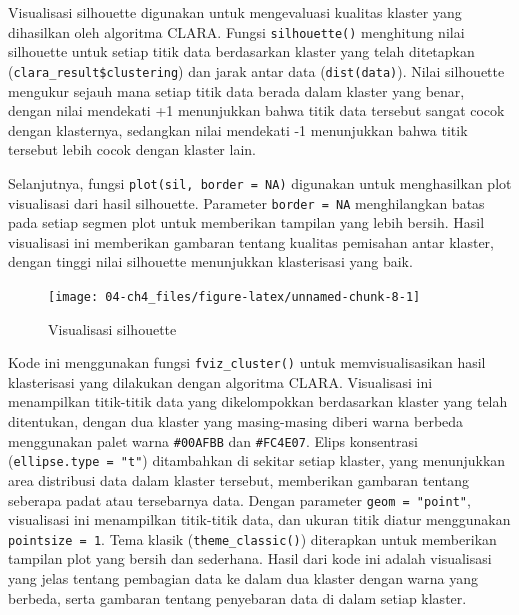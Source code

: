 \documentclass[
  oneside]{book}
\newenvironment{Shaded}{\begin{snugshade}}{\end{snugshade}}
\newcommand{\AttributeTok}[1]{\textcolor[rgb]{0.13,0.29,0.53}{#1}}
\newcommand{\ConstantTok}[1]{\textcolor[rgb]{0.56,0.35,0.01}{#1}}
\newcommand{\FunctionTok}[1]{\textcolor[rgb]{0.13,0.29,0.53}{\textbf{#1}}}
\newcommand{\NormalTok}[1]{#1}
\newcommand{\OtherTok}[1]{\textcolor[rgb]{0.56,0.35,0.01}{#1}}
\newcommand{\SpecialCharTok}[1]{\textcolor[rgb]{0.81,0.36,0.00}{\textbf{#1}}}
\begin{document}
Visualisasi silhouette digunakan untuk mengevaluasi kualitas klaster yang dihasilkan oleh algoritma CLARA. Fungsi \texttt{silhouette()} menghitung nilai silhouette untuk setiap titik data berdasarkan klaster yang telah ditetapkan (\texttt{clara\_result\$clustering}) dan jarak antar data (\texttt{dist(data)}). Nilai silhouette mengukur sejauh mana setiap titik data berada dalam klaster yang benar, dengan nilai mendekati +1 menunjukkan bahwa titik data tersebut sangat cocok dengan klasternya, sedangkan nilai mendekati -1 menunjukkan bahwa titik tersebut lebih cocok dengan klaster lain.

Selanjutnya, fungsi \texttt{plot(sil,\ border\ =\ NA)} digunakan untuk menghasilkan plot visualisasi dari hasil silhouette. Parameter \texttt{border\ =\ NA} menghilangkan batas pada setiap segmen plot untuk memberikan tampilan yang lebih bersih. Hasil visualisasi ini memberikan gambaran tentang kualitas pemisahan antar klaster, dengan tinggi nilai silhouette menunjukkan klasterisasi yang baik.

\begin{Shaded}
\end{Shaded}

\begin{figure}[h]

{\centering \texttt{[image: 04-ch4\_files/figure-latex/unnamed-chunk-8-1]} 

}

\caption{Visualisasi silhouette}\label{fig:unnamed-chunk-8}
\end{figure}

Kode ini menggunakan fungsi \texttt{fviz\_cluster()} untuk memvisualisasikan hasil klasterisasi yang dilakukan dengan algoritma CLARA. Visualisasi ini menampilkan titik-titik data yang dikelompokkan berdasarkan klaster yang telah ditentukan, dengan dua klaster yang masing-masing diberi warna berbeda menggunakan palet warna \texttt{\#00AFBB} dan \texttt{\#FC4E07}. Elips konsentrasi (\texttt{ellipse.type\ =\ "t"}) ditambahkan di sekitar setiap klaster, yang menunjukkan area distribusi data dalam klaster tersebut, memberikan gambaran tentang seberapa padat atau tersebarnya data. Dengan parameter \texttt{geom\ =\ "point"}, visualisasi ini menampilkan titik-titik data, dan ukuran titik diatur menggunakan \texttt{pointsize\ =\ 1}. Tema klasik (\texttt{theme\_classic()}) diterapkan untuk memberikan tampilan plot yang bersih dan sederhana. Hasil dari kode ini adalah visualisasi yang jelas tentang pembagian data ke dalam dua klaster dengan warna yang berbeda, serta gambaran tentang penyebaran data di dalam setiap klaster.
\end{document}
